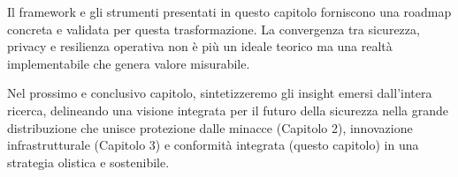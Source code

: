 Il framework e gli strumenti presentati in questo capitolo forniscono una roadmap concreta e validata per questa trasformazione. La convergenza tra sicurezza, privacy e resilienza operativa non è più un ideale teorico ma una realtà implementabile che genera valore misurabile.

Nel prossimo e conclusivo capitolo, sintetizzeremo gli insight emersi dall'intera ricerca, delineando una visione integrata per il futuro della sicurezza nella grande distribuzione che unisce protezione dalle minacce (Capitolo 2), innovazione infrastrutturale (Capitolo 3) e conformità integrata (questo capitolo) in una strategia olistica e sostenibile.

\clearpage
\printbibliography[
    heading=subbibliography,
    title={Riferimenti Bibliografici del Capitolo 4},
]

